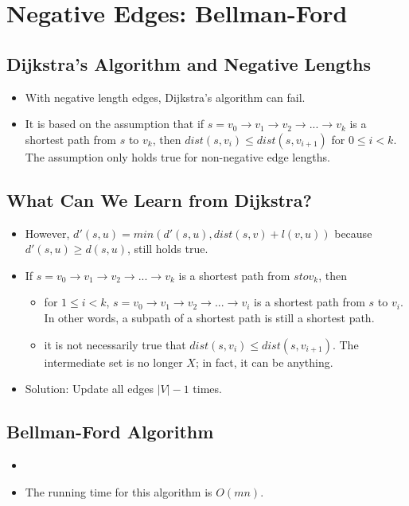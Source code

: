 
\section{Negative Edges: Bellman-Ford}

\subsection{Dijkstra's Algorithm and Negative Lengths}
\begin{itemize}
    \item With negative length edges, Dijkstra's algorithm can fail.
    \item It is based on the assumption that if $s = v_0 \rightarrow v_1 \rightarrow v_2  \rightarrow ... \rightarrow v_k$ is a shortest path from $s$ to $v_k$, then $dist(s, v_i) \leq dist(s, v_{i + 1})$ for $0 \leq i < k$. The assumption only holds true for non-negative edge lengths.
\end{itemize}

\subsection{What Can We Learn from Dijkstra?}
\begin{itemize}
    \item However, $d'(s, u) = min(d'(s, u), dist(s, v) + l(v, u))$ because $d'(s, u) \geq d(s, u)$, still holds true.
    \item If $s = v_0 \rightarrow v_1 \rightarrow v_2 \rightarrow ... \rightarrow v_k$ is a shortest path from $s to v_k$, then
    \begin{itemize}
        \item for $1 \leq i < k$, $s = v_0 \rightarrow v_1 \rightarrow v_2 \rightarrow ... \rightarrow v_i$ is a shortest path from $s$ to $v_i$. In other words, a subpath of a shortest path is still a shortest path.
        \item it is not necessarily true that $dist(s, v_i) \leq dist(s, v_{i + 1})$. The intermediate set is no longer $X$; in fact, it can be anything.
    \end{itemize}
    \item Solution: Update all edges $\left|V\right| - 1$ times.
\end{itemize}

\subsection{Bellman-Ford Algorithm}
\begin{itemize}
    \item[] 
    \item The running time for this algorithm is $O(mn)$.
\end{itemize}

